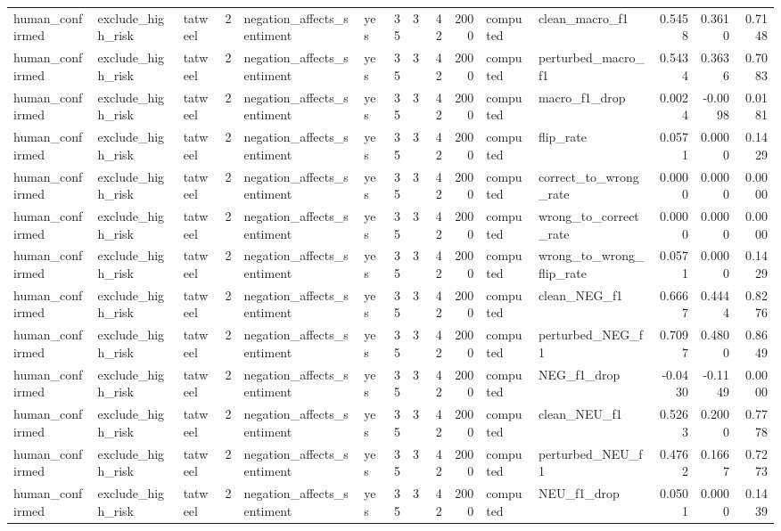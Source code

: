 \begin{tabular}{lllrllrrrrllrrr}
human_confirmed & exclude_high_risk & tatweel & 2 & negation_affects_sentiment & yes & 35 & 3 & 42 & 2000 & computed & clean_macro_f1 & 0.5458 & 0.3610 & 0.7148 \\
human_confirmed & exclude_high_risk & tatweel & 2 & negation_affects_sentiment & yes & 35 & 3 & 42 & 2000 & computed & perturbed_macro_f1 & 0.5434 & 0.3636 & 0.7083 \\
human_confirmed & exclude_high_risk & tatweel & 2 & negation_affects_sentiment & yes & 35 & 3 & 42 & 2000 & computed & macro_f1_drop & 0.0024 & -0.0098 & 0.0181 \\
human_confirmed & exclude_high_risk & tatweel & 2 & negation_affects_sentiment & yes & 35 & 3 & 42 & 2000 & computed & flip_rate & 0.0571 & 0.0000 & 0.1429 \\
human_confirmed & exclude_high_risk & tatweel & 2 & negation_affects_sentiment & yes & 35 & 3 & 42 & 2000 & computed & correct_to_wrong_rate & 0.0000 & 0.0000 & 0.0000 \\
human_confirmed & exclude_high_risk & tatweel & 2 & negation_affects_sentiment & yes & 35 & 3 & 42 & 2000 & computed & wrong_to_correct_rate & 0.0000 & 0.0000 & 0.0000 \\
human_confirmed & exclude_high_risk & tatweel & 2 & negation_affects_sentiment & yes & 35 & 3 & 42 & 2000 & computed & wrong_to_wrong_flip_rate & 0.0571 & 0.0000 & 0.1429 \\
human_confirmed & exclude_high_risk & tatweel & 2 & negation_affects_sentiment & yes & 35 & 3 & 42 & 2000 & computed & clean_NEG_f1 & 0.6667 & 0.4444 & 0.8276 \\
human_confirmed & exclude_high_risk & tatweel & 2 & negation_affects_sentiment & yes & 35 & 3 & 42 & 2000 & computed & perturbed_NEG_f1 & 0.7097 & 0.4800 & 0.8649 \\
human_confirmed & exclude_high_risk & tatweel & 2 & negation_affects_sentiment & yes & 35 & 3 & 42 & 2000 & computed & NEG_f1_drop & -0.0430 & -0.1149 & 0.0000 \\
human_confirmed & exclude_high_risk & tatweel & 2 & negation_affects_sentiment & yes & 35 & 3 & 42 & 2000 & computed & clean_NEU_f1 & 0.5263 & 0.2000 & 0.7778 \\
human_confirmed & exclude_high_risk & tatweel & 2 & negation_affects_sentiment & yes & 35 & 3 & 42 & 2000 & computed & perturbed_NEU_f1 & 0.4762 & 0.1667 & 0.7273 \\
human_confirmed & exclude_high_risk & tatweel & 2 & negation_affects_sentiment & yes & 35 & 3 & 42 & 2000 & computed & NEU_f1_drop & 0.0501 & 0.0000 & 0.1439 \\

\end{tabular}
